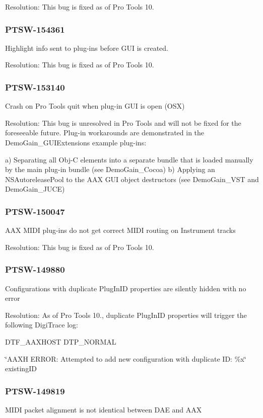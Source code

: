 Resolution\+: This bug is fixed as of Pro Tools 10.\hypertarget{a00846_PTSW-154361}{}\subsubsection{P\+T\+S\+W-\/154361}\label{a00846_PTSW-154361}
Highlight info sent to plug-\/ins before G\+UI is created.

Resolution\+: This bug is fixed as of Pro Tools 10.\hypertarget{a00846_PTSW-153140}{}\subsubsection{P\+T\+S\+W-\/153140}\label{a00846_PTSW-153140}
Crash on Pro Tools quit when plug-\/in G\+UI is open (O\+SX)

Resolution\+: This bug is unresolved in Pro Tools and will not be fixed for the foreseeable future. Plug-\/in workarounds are demonstrated in the Demo\+Gain\+\_\+\+G\+U\+I\+Extensions example plug-\/ins\+:

a) Separating all Obj-\/C elements into a separate bundle that is loaded manually by the main plug-\/in bundle (see Demo\+Gain\+\_\+\+Cocoa) b) Applying an N\+S\+Autorelease\+Pool to the A\+AX G\+UI object destructors (see Demo\+Gain\+\_\+\+V\+ST and Demo\+Gain\+\_\+\+J\+U\+CE)\hypertarget{a00846_PTSW-150047}{}\subsubsection{P\+T\+S\+W-\/150047}\label{a00846_PTSW-150047}
A\+AX M\+I\+DI plug-\/ins do not get correct M\+I\+DI routing on Instrument tracks

Resolution\+: This bug is fixed as of Pro Tools 10.\hypertarget{a00846_PTSW-149880}{}\subsubsection{P\+T\+S\+W-\/149880}\label{a00846_PTSW-149880}
Configurations with duplicate Plug\+In\+ID properties are silently hidden with no error

Resolution\+: As of Pro Tools 10., duplicate Plug\+In\+ID properties will trigger the following Digi\+Trace log\+:

D\+T\+F\+\_\+\+A\+A\+X\+H\+O\+ST D\+T\+P\+\_\+\+N\+O\+R\+M\+AL

\char`\"{}\+A\+A\+X\+H E\+R\+R\+O\+R\+: Attempted to add new configuration with duplicate I\+D\+: \%x\char`\"{} existing\+ID\hypertarget{a00846_PTSW-149819}{}\subsubsection{P\+T\+S\+W-\/149819}\label{a00846_PTSW-149819}
M\+I\+DI packet alignment is not identical between D\+AE and A\+AX

